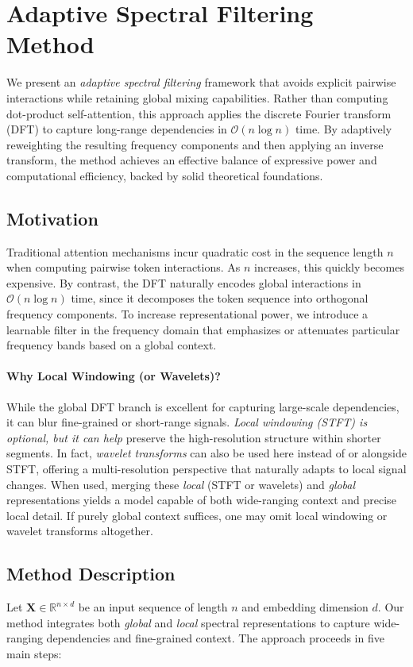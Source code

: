 \section{Adaptive Spectral Filtering Method}
\label{sec:adaptive_spectral_filtering}

We present an \emph{adaptive spectral filtering} framework that avoids explicit pairwise interactions while retaining global mixing capabilities. Rather than computing dot-product self-attention, this approach applies the discrete Fourier transform (DFT) to capture long-range dependencies in \(\mathcal{O}(n \log n)\) time. By adaptively reweighting the resulting frequency components and then applying an inverse transform, the method achieves an effective balance of expressive power and computational efficiency, backed by solid theoretical foundations.

\subsection{Motivation}
Traditional attention mechanisms incur quadratic cost in the sequence length \(n\) when computing pairwise token interactions. As \(n\) increases, this quickly becomes expensive. By contrast, the DFT naturally encodes global interactions in \(\mathcal{O}(n \log n)\) time, since it decomposes the token sequence into orthogonal frequency components. To increase representational power, we introduce a learnable filter in the frequency domain that emphasizes or attenuates particular frequency bands based on a global context.

\paragraph{Why Local Windowing (or Wavelets)?}
While the global DFT branch is excellent for capturing large-scale dependencies, it can blur fine-grained or short-range signals. \emph{Local windowing (STFT) is optional, but it can help} preserve the high-resolution structure within shorter segments. In fact, \emph{wavelet transforms} can also be used here instead of or alongside STFT, offering a multi-resolution perspective that naturally adapts to local signal changes. When used, merging these \emph{local} (STFT or wavelets) and \emph{global} representations yields a model capable of both wide-ranging context and precise local detail. If purely global context suffices, one may omit local windowing or wavelet transforms altogether.

\subsection{Method Description}
Let \(\mathbf{X} \in \mathbb{R}^{n \times d}\) be an input sequence of length \(n\) and embedding dimension \(d\). Our method integrates both \emph{global} and \emph{local} spectral representations to capture wide-ranging dependencies and fine-grained context. The approach proceeds in five main steps:

